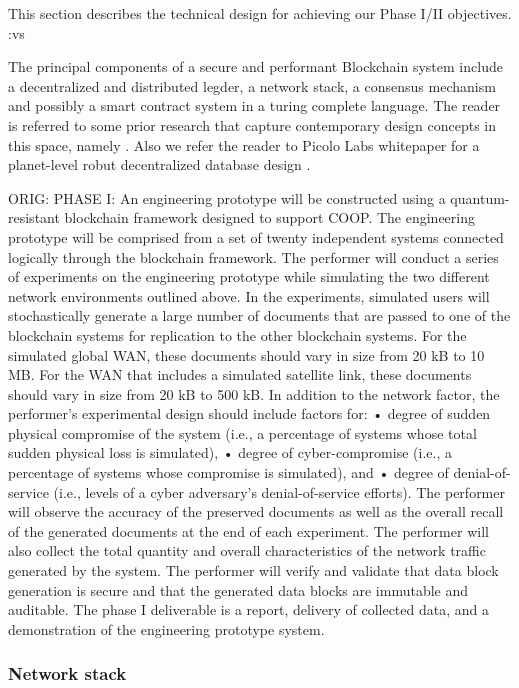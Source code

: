 \label{sec:design}
This section describes the technical design for achieving our Phase I/II objectives. :vs

The principal components of a secure and performant Blockchain system include a decentralized and distributed legder, a
network stack, a consensus mechanism and possibly a smart contract system in a turing complete language. The reader is
referred to some prior research that capture contemporary design concepts in this space, namely \cite{micali16,
garay2015, ava2018}. Also we refer the reader to Picolo Labs whitepaper for a planet-level robut decentralized database
design \cite{picolo}.

ORIG:
PHASE I: An engineering prototype will be constructed using a quantum-resistant blockchain framework designed to support
COOP. The engineering prototype will be comprised from a set of twenty independent systems connected logically through
the blockchain framework. The performer will conduct a series of experiments on the engineering prototype while
simulating the two different network environments outlined above. In the experiments, simulated users will
stochastically generate a large number of documents that are passed to one of the blockchain systems for replication to
the other blockchain systems. For the simulated global WAN, these documents should vary in size from 20 kB to 10 MB. For
the WAN that includes a simulated satellite link, these documents should vary in size from 20 kB to 500 kB. In addition
to the network factor, the performer’s experimental design should include factors for: • degree of sudden physical
compromise of the system (i.e., a percentage of systems whose total sudden physical loss is simulated), • degree of
cyber-compromise (i.e., a percentage of systems whose compromise is simulated), and • degree of denial-of-service (i.e.,
levels of a cyber adversary’s denial-of-service efforts). The performer will observe the accuracy of the preserved
documents as well as the overall recall of the generated documents at the end of each experiment. The performer will
also collect the total quantity and overall characteristics of the network traffic generated by the system. The
performer will verify and validate that data block generation is secure and that the generated data blocks are immutable
and auditable. The phase I deliverable is a report, delivery of collected data, and a demonstration of the engineering
prototype system.

\subsubsection{Network stack}

